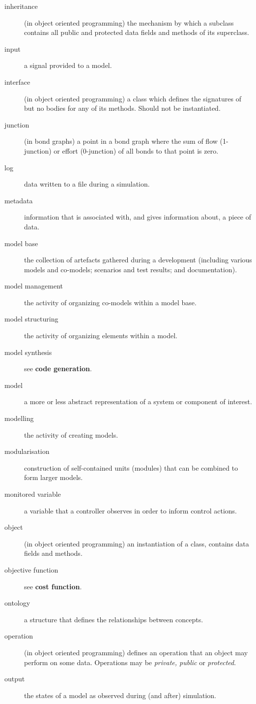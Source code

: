 \documentclass{crescendorepchap}
\begin{document}
\begin{description}
\item[inheritance] (in object oriented programming) the mechanism by which a subclass contains all public and protected data fields and methods of its superclass.
\item[input] a signal provided to a model.
\item[interface] (in object oriented programming) a class which defines the signatures of but no bodies for any of its methods.  Should not be instantiated.
\item[junction] (in bond graphs) a point in a bond graph where the sum of flow (1-junction) or effort (0-junction) of all bonds to that point is zero.
\item[log] data written to a file during a simulation.
\item[metadata] information that is associated with, and gives information about, a piece of data.
\item[model base] the collection of artefacts gathered during a development (including various models and co-models; scenarios and test results; and documentation).
\item[model management] the activity of organizing co-models within a model base.
\item[model structuring] the activity of organizing elements within a model.
\item[model synthesis] see \textbf{code generation}.
\item[model] a more or less abstract representation of a system or component of interest.
\item[modelling] the activity of creating models.
\item[modularisation] construction of self-contained units (modules) that can be combined to form larger models.
\item[monitored variable] a variable that a controller observes in order to inform control actions.
\item[object] (in object oriented programming) an instantiation of a class, contains data fields and methods.
\item[objective function] see \textbf{cost function}.
\item[ontology] a structure that defines the relationships between concepts.
\item[operation] (in object oriented programming) defines an operation that an object may perform on some data.  Operations may be \emph{private, public} or \emph{protected}.
\item[output] the states of a model as observed during (and after) simulation.

\end{description}
\end{document}
